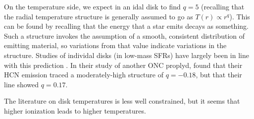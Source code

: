 



On the temperature side, we expect in an idal disk to find $q=5$ (recalling that the radial temperature structure is generally assumed to go as $T(r) \propto r^{q}$). This can be found by recalling that the energy that a star emits decays as something. Such a structure invokes the assumption of a smooth, consistent distribution of emitting material, so variations from that value indicate variations in the structure. Studies of individal disks (in low-mass SFRs) have largely been in line with this prediction \citep[e.g. ][, whose values range from -0.22 to -0.7]{Dartois2003,Panic2008,Panic2010,Hughes2008,Qi2003,Qi2004,Isella2007,Rosenfeld2012,Flaherty2015,Flaherty2017,Zhang2017,Flaherty2018}. In their study of another ONC proplyd, \citet{Factor2017} found that their HCN emission traced a moderately-high structure of $q=-0.18$, but that their \hco line showed $q=0.17$.


The literature on disk temperatures is less well constrained, but it seems that higher ionization leads to higher temperatures.





